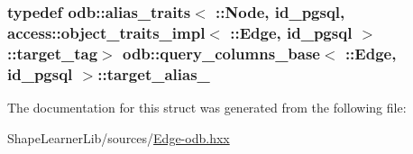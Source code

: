 \subsubsection[{target\+\_\+alias\+\_\+}]{\setlength{\rightskip}{0pt plus 5cm}typedef odb\+::alias\+\_\+traits$<$ \+::{\bf Node}, id\+\_\+pgsql, access\+::object\+\_\+traits\+\_\+impl$<$ \+::{\bf Edge}, id\+\_\+pgsql $>$\+::target\+\_\+tag$>$ odb\+::query\+\_\+columns\+\_\+base$<$ \+::{\bf Edge}, id\+\_\+pgsql $>$\+::{\bf target\+\_\+alias\+\_\+}}\label{structodb_1_1query__columns__base_3_01_1_1_edge_00_01id__pgsql_01_4_ab87aa44ce979953bb90a322eba2a996d}


The documentation for this struct was generated from the following file\+:\begin{DoxyCompactItemize}
\item 
Shape\+Learner\+Lib/sources/\hyperlink{_edge-odb_8hxx}{Edge-\/odb.\+hxx}\end{DoxyCompactItemize}
